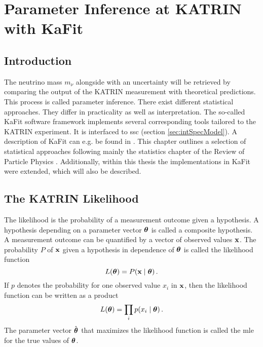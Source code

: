 

\chapter{Parameter Inference at KATRIN with KaFit}
\section{Introduction}
The neutrino mass $m_\nu$ alongside with an uncertainty will be retrieved by comparing the output of the KATRIN measurement with theoretical predictions. This process is called parameter inference. There exist different statistical approaches. They differ in practicality as well as interpretation. The so-called KaFit software framework implements several corresponding tools tailored to the KATRIN experiment. It is interfaced to \gls{ssc} (section \ref{sec:intSpecModel}). A description of KaFit can e.g. be found in \cite{Kleesiek2014}. This chapter outlines a selection of statistical approaches following mainly the statistics chapter of the Review of Particle Physics \cite{ReviewOfParticlePhysics}. Additionally, within this thesis the implementations in KaFit were extended, which will also be described.

\section{The KATRIN Likelihood}
The likelihood is the probability of a measurement outcome given a hypothesis. A hypothesis depending on a parameter vector $\boldsymbol{\mathbf{\theta}}$ is called a composite hypothesis. A measurement outcome can be quantified by a vector of observed values $\boldsymbol{\mathbf{x}}$. The probability $P$ of $\boldsymbol{\mathbf{x}}$ given a hypothesis in dependence of $\boldsymbol{\mathbf{\theta}}$ is called the likelihood function
\begin{equation}
	L(\paramVec) = P\giventhat{\dataVec}{\paramVec}
	\fullstop
\end{equation}
If $p$ denotes the probability for one observed value $x_i$ in $\boldsymbol{\mathbf{x}}$, then the likelihood function can be written as a product
\begin{equation}
	L(\paramVec) = \prod_{i} p\giventhat{x_i}{\paramVec}
	\fullstop
\end{equation}
The parameter vector $\hat{\boldsymbol{\mathbf{\theta}}}$ that maximizes the likelihood function is called the \gls{mle} for the true values of $\boldsymbol{\mathbf{\theta}}$.

